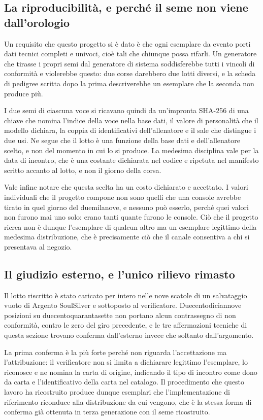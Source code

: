 \subsection{La riproducibilità, e perché il seme non viene dall'orologio}

Un requisito che questo progetto si è dato è che ogni esemplare da evento porti dati tecnici completi e univoci, cioè tali che chiunque possa rifarli. Un generatore che tirasse i propri semi dal generatore di sistema soddisferebbe tutti i vincoli di conformità e violerebbe questo: due corse darebbero due lotti diversi, e la scheda di pedigree scritta dopo la prima descriverebbe un esemplare che la seconda non produce più.

I due semi di ciascuna voce si ricavano quindi da un'impronta SHA-256 di una chiave che nomina l'indice della voce nella base dati, il valore di personalità che il modello dichiara, la coppia di identificativi dell'allenatore e il sale che distingue i due usi. Ne segue che il lotto è una funzione della base dati e dell'allenatore scelto, e non del momento in cui lo si produce. La medesima disciplina vale per la data di incontro, che è una costante dichiarata nel codice e ripetuta nel manifesto scritto accanto al lotto, e non il giorno della corsa.

Vale infine notare che questa scelta ha un costo dichiarato e accettato. I valori individuali che il progetto compone non sono quelli che una console avrebbe tirato in quel giorno del duemilanove, e nessuno può esserlo, perché quei valori non furono mai uno solo: erano tanti quante furono le console. Ciò che il progetto ricrea non è dunque l'esemplare di qualcun altro ma un esemplare legittimo della medesima distribuzione, che è precisamente ciò che il canale consentiva a chi si presentava al negozio.

\subsection{Il giudizio esterno, e l'unico rilievo rimasto}

Il lotto riscritto è stato caricato per intero nelle nove scatole di un salvataggio vuoto di Argento SoulSilver e sottoposto al verificatore. Duecentodiciannove posizioni su duecentoquarantasette non portano alcun contrassegno di non conformità, contro le zero del giro precedente, e le tre affermazioni tecniche di questa sezione trovano conferma dall'esterno invece che soltanto dall'argomento.

La prima conferma è la più forte perché non riguarda l'accettazione ma l'attribuzione: il verificatore non si limita a dichiarare legittimo l'esemplare, lo riconosce e ne nomina la carta di origine, indicando il tipo di incontro come dono da carta e l'identificativo della carta nel catalogo. Il procedimento che questo lavoro ha ricostruito produce dunque esemplari che l'implementazione di riferimento riconduce alla distribuzione da cui vengono, che è la stessa forma di conferma già ottenuta in terza generazione con il seme ricostruito.

